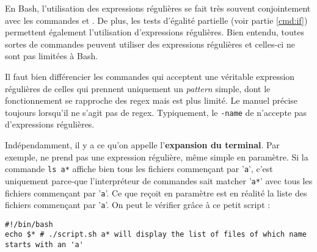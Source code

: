 En Bash, l'utilisation des expressions régulières se fait très souvent conjointement avec les commandes  et . De plus, les tests d'égalité partielle (voir partie \ref{cmd:if}) permettent également l'utilisation d'expressions régulières. Bien entendu, toutes sortes de commandes peuvent utiliser des expressions régulières et celles-ci ne sont pas limitées à Bash. 


Il faut bien différencier les commandes qui acceptent une véritable expression régulières de celles qui prennent uniquement un \textit{pattern} simple, dont le fonctionnement se rapproche des regex mais est plus limité. Le manuel précise toujours lorsqu'il ne s'agit pas de regex. Typiquement, le \texttt{-name} de  n'accepte pas d'expressions régulières.

Indépendamment, il y a ce qu'on appelle l'\textbf{expansion du terminal}. Par exemple,  ne prend pas une expression régulière, même simple en paramètre. Si la commande \texttt{ls a*} affiche bien tous les fichiers commençant par '\texttt{a}', c'est uniquement parce-que l'interpréteur de commandes sait matcher '\texttt{a*}' avec tous les fichiers commençant par '\texttt{a}'. Ce que  reçoit en paramètre est en réalité la liste des fichiers commençant par '\texttt{a}'. On peut le vérifier grâce à ce petit script :


\begin{code}
    \begin{verbatim}
#!/bin/bash
echo $* # ./script.sh a* will display the list of files of which name starts with an 'a'
    \end{verbatim}
    
    \vspace{-0.5cm}
    \label{code:expansion}
\end{code}